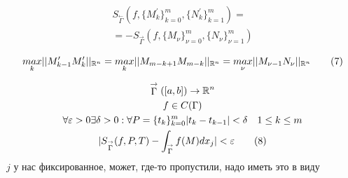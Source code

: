 \documentclass[main]{subfiles}
\begin{document}
\begin{multline*}
    S_{\stackrel{\leftarrow}{\Gamma}}(f, \{ M^\prime_k \}^m_{k=0}, \{N_k^\prime\}^m_{k=1}) = \\
    = -S_{\stackrel{\rightarrow}{\Gamma}}(f, \{ M_\nu \}^m_{\nu=0}, \{N_\nu\}_{\nu=1}^m) \tag{6\prime} \\
\end{multline*}
\[ \underset{k}{max} || M^\prime_{k-1}M^\prime_k||_{{\mathbb{R}^n}} = \underset{k}{max} ||M_{m-k+1}M_{m-k}||_{{\mathbb{R}^n}} =
\underset{\nu}{max} || M_{\nu-1}N_{\nu} ||_{{\mathbb{R}^n}} \tag{7} \]
\begin{theorem}
    \begin{gather*}
        \stackrel{\rightarrow}{\Gamma}([a,b]) \rightarrow {\mathbb{R}^n} \\
        f \in C(\Gamma)\\
        \forall \varepsilon > 0 \exists \delta > 0 : \forall P = \{t_k \}^m_{k=0} |t_k - t_{k-1}| < \delta \quad 1 \leq k \leq m \\
        |S_{\stackrel{\rightarrow}{\Gamma}}(f,P,T) - \int_{\stackrel{\rightarrow}{\Gamma}} f(M)dx_j| < \varepsilon \tag{8}\\
    \end{gather*}
    $j$ у нас фиксированное, может, где-то пропустили, надо иметь это в виду
\end{theorem}
\end{document}
